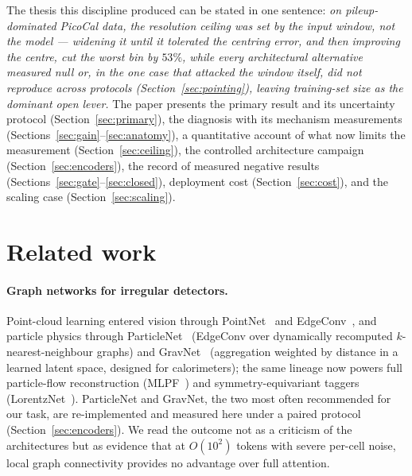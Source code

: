 \documentclass[11pt,a4paper]{article}
\begin{document}
The thesis this discipline produced can be stated in one sentence: \emph{on
pileup-dominated PicoCal data, the resolution ceiling was set by the input
window, not the model --- widening it until it tolerated the centring error,
and then improving the centre, cut the worst bin by $53\%$, while every
architectural alternative measured null or, in the one case that attacked
the window itself, did not reproduce across protocols
(Section~\ref{sec:pointing}), leaving training-set size as the dominant
open lever.} The paper presents
the primary result and its uncertainty protocol
(Section~\ref{sec:primary}), the diagnosis with its mechanism measurements
(Sections~\ref{sec:gain}--\ref{sec:anatomy}), a quantitative account of what
now limits the measurement (Section~\ref{sec:ceiling}), the controlled architecture
campaign (Section~\ref{sec:encoders}), the record of measured negative
results (Sections~\ref{sec:gate}--\ref{sec:closed}), deployment cost
(Section~\ref{sec:cost}), and the scaling case (Section~\ref{sec:scaling}).

\section{Related work}
\label{sec:related}

\paragraph{Graph networks for irregular detectors.}
Point-cloud learning entered vision through PointNet~\cite{pointnet} and
EdgeConv~\cite{dgcnn}, and particle physics through
ParticleNet~\cite{particlenet} (EdgeConv over dynamically recomputed
$k$-nearest-neighbour graphs) and GravNet~\cite{gravnet} (aggregation
weighted by distance in a learned latent space, designed for calorimeters);
the same lineage now powers full particle-flow reconstruction
(MLPF~\cite{mlpf}) and symmetry-equivariant taggers
(LorentzNet~\cite{lorentznet}). ParticleNet and GravNet, the two most
often recommended for our task, are re-implemented and measured here under
a paired protocol (Section~\ref{sec:encoders}). We read the outcome not as
a criticism of the architectures but as evidence that at $O(10^2)$ tokens
with severe per-cell noise, local graph connectivity provides no advantage over full
attention.
\end{document}
